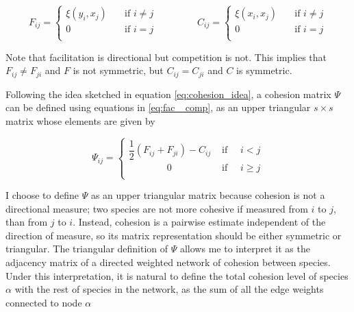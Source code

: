 \documentclass[titlepage,11pt]{article}
\begin{document}
\begin{linenumbers}
					\begin{linenomath*}	
						\begin{equation}\label{eq:fac _comp}	
							F_{ij} = 
							\begin{cases}
							\xi(y_i, x_j)&\quad\text{if } i \neq j \\
							0&\quad\text{if } i = j \\
							\end{cases}
							\hspace{50pt}
							C_{ij} = 
							\begin{cases}
							\xi(x_i, x_j)&\quad\text{if } i \neq j \\
							0&\quad\text{if } i = j \\
							\end{cases}
						\end{equation}	
					\end{linenomath*}
					Note that facilitation is directional but competition is not. This implies that $ F_{ij} \neq F_{ji}$ and $ F $ is not symmetric, but $ C_{ij} = C_{ji} $ and $ C $ is symmetric.\par
					Following the idea sketched in equation \ref{eq:cohesion_idea}, a cohesion matrix $ \Psi $ can be defined using equations in \ref{eq:fac _comp},  as an upper triangular $ s \times s $ matrix whose elements are given by
					\begin{linenomath*}
						\begin{equation}
							\Psi_{ij} = 
							\begin{cases}
								\dfrac12 \left(F_{ij} + F_{ji}\right) -  C_{ij} & \text{ if }  \quad i < j \\
							    \quad\quad\quad\quad	0 & \text{ if } \quad  i \geq j\\
							\end{cases}
						\end{equation}
					\end{linenomath*}
					I choose to define $ \Psi $ as an upper triangular matrix because cohesion is not a directional measure; two species are not more cohesive if measured from $ i $ to $ j $, than from $ j $ to $ i $. Instead, cohesion is a pairwise estimate independent of the direction of measure, so its matrix representation should be either symmetric or triangular. The triangular definition of $ \Psi $ allows me to interpret it as the adjacency matrix of a directed weighted network of cohesion between species. Under this interpretation, it is natural to define the total cohesion level of species $ \alpha $ with the rest of species in the network, as the sum of all the edge weights connected to node $ \alpha $

\end{linenumbers}
\end{document}
